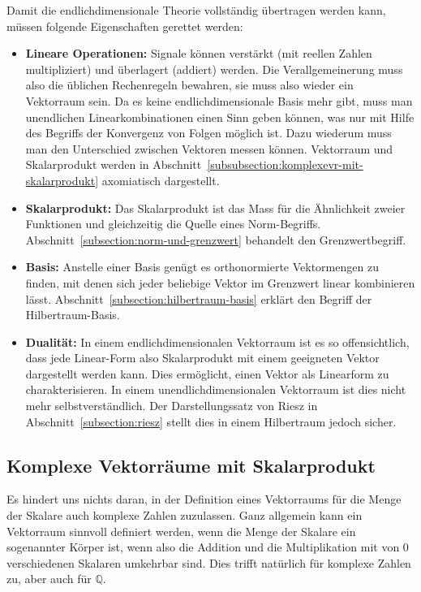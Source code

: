 Damit die endlichdimensionale Theorie vollständig übertragen werden kann,
müssen folgende Eigenschaften gerettet werden:
\begin{itemize}
\item {\bf Lineare Operationen:}
Signale können verstärkt (mit reellen Zahlen multipliziert) und überlagert
(addiert) werden.
Die Verallgemeinerung muss also die üblichen Rechenregeln bewahren,
sie muss also wieder ein Vektorraum sein.
Da es keine endlichdimensionale Basis mehr gibt, muss man unendlichen
Linearkombinationen einen Sinn geben können, was nur mit Hilfe des
Begriffs der Konvergenz von Folgen möglich ist.
Dazu wiederum muss man den Unterschied zwischen Vektoren messen können.
Vektorraum und Skalarprodukt werden in
Abschnitt~\ref{subsubsection:komplexevr-mit-skalarprodukt}
axomiatisch dargestellt.
\item {\bf Skalarprodukt:}
Das Skalarprodukt ist das Mass für die Ähnlichkeit zweier Funktionen
und gleichzeitig die Quelle eines Norm-Begriffs.
Abschnitt~\ref{subsection:norm-und-grenzwert} behandelt den Grenzwertbegriff.
\item {\bf Basis:}
Anstelle einer Basis genügt es orthonormierte Vektormengen zu finden,
mit denen sich jeder beliebige Vektor im Grenzwert linear kombinieren
lässt.
Abschnitt~\ref{subsection:hilbertraum-basis} erklärt den Begriff der
Hilbertraum-Basis.
\item {\bf Dualität:}
In einem endlichdimensionalen Vektorraum ist es so offensichtlich, dass
jede Linear-Form also Skalarprodukt mit einem geeigneten Vektor 
dargestellt werden kann.
Dies ermöglicht, einen Vektor als Linearform zu charakterisieren.
In einem unendlichdimensionalen Vektorraum ist dies nicht mehr
selbstverständlich.
Der Darstellungssatz von Riesz in Abschnitt~\ref{subsection:riesz}
stellt dies in einem Hilbertraum jedoch sicher.
\end{itemize}

\subsection{Komplexe Vektorräume mit Skalarprodukt
\label{subsubsection:komplexevr-mit-skalarprodukt}}
Es hindert uns nichts daran, in der Definition eines Vektorraums für die
Menge der Skalare auch komplexe Zahlen zuzulassen.
Ganz allgemein kann ein Vektorraum sinnvoll definiert werden, wenn die Menge
der Skalare ein sogenannter Körper ist, wenn also die Addition
und die Multiplikation mit von $0$ verschiedenen Skalaren umkehrbar sind.
Dies trifft natürlich für komplexe Zahlen zu, aber auch für $\mathbb Q$.

